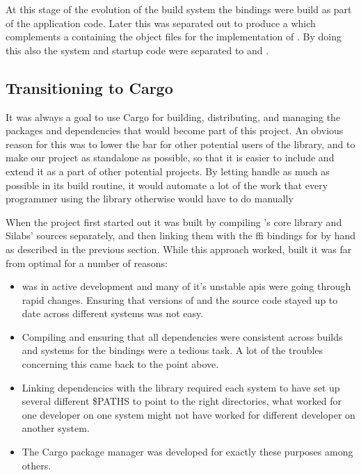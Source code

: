 At this stage of the evolution of the build system the {\emlib} bindings were build as part of the {\rust} application code.
Later this was separated out to produce a  which complements a  containing the object files for the implementation of {\emlib}.
By doing this also the system and startup code were separated to  and .

\subsection{Transitioning to Cargo}
\label{ssub:transitioning_to_cargo}

It was always a goal to use Cargo for building, distributing, and managing the packages and dependencies that would become part of this project.
An obvious reason for this was to lower the bar for other potential users of the library, and to make our project as standalone as possible, so that it is easier to include and extend it as a part of other potential projects.
By letting {\cargo} handle as much as possible in its build routine, it would automate a lot of the work that every programmer using the library otherwise would have to do manually

When the project first started out it was built by compiling {\rust}'s core library and Silabs' {\emlib} {\C} sources separately, and then linking them with the \gls{ffi} bindings for {\emlib} by hand as described in the previous section.
While this approach worked, built it was far from optimal for a number of reasons:

\begin{itemize}
    \item {\rust} was in active development and many of it's unstable \glspl{api} were going through rapid changes. Ensuring that versions of {\rustc} and the {\rust} source code stayed up to date across different systems was not easy.
    \item Compiling and ensuring that all dependencies were consistent across builds and systems for the bindings were a tedious task. A lot of the troubles concerning this came back to the point above.
    \item Linking dependencies with the library required each system to have set up several different \$PATHS to point to the right directories, what worked for one developer on one system might not have worked for different developer on another system.
    \item The Cargo package manager was developed for exactly these purposes among others.
\end{itemize}

